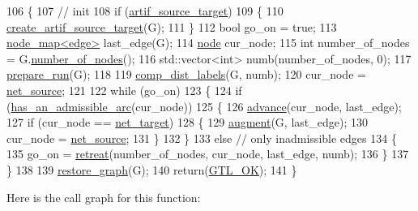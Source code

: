 \begin{DoxyCode}
106 \{
107     \textcolor{comment}{// init}
108     \textcolor{keywordflow}{if} (\mbox{\hyperlink{classmaxflow__sap_a5d19d178a861e252c84fc392e19bf0ae}{artif\_source\_target}})
109     \{
110         \mbox{\hyperlink{classmaxflow__sap_a617016b94a4924fb2574ab87c970d49c}{create\_artif\_source\_target}}(G);
111     \}
112     \textcolor{keywordtype}{bool} go\_on = \textcolor{keyword}{true};
113     \mbox{\hyperlink{classnode__map}{node\_map<edge>}} last\_edge(G);
114     \mbox{\hyperlink{classnode}{node}} cur\_node;
115     \textcolor{keywordtype}{int} number\_of\_nodes = G.\mbox{\hyperlink{classgraph_a42c78e0a9f115655e3ff0efe35ebfc4e}{number\_of\_nodes}}();
116     std::vector<int> numb(number\_of\_nodes, 0);
117     \mbox{\hyperlink{classmaxflow__sap_a4504b071456d536371ff6d07055e800d}{prepare\_run}}(G);
118 
119     \mbox{\hyperlink{classmaxflow__sap_ab9a8d9e4e32a8eb6390c0d2fb3cb9596}{comp\_dist\_labels}}(G, numb);
120     cur\_node = \mbox{\hyperlink{classmaxflow__sap_abd4266c76dbd73f7f719d3a4fba2655d}{net\_source}};
121 
122     \textcolor{keywordflow}{while} (go\_on)
123     \{
124         \textcolor{keywordflow}{if} (\mbox{\hyperlink{classmaxflow__sap_a4fdfe2e37832ed2e522b5c972aa1ba5f}{has\_an\_admissible\_arc}}(cur\_node))
125         \{
126             \mbox{\hyperlink{classmaxflow__sap_a0eb02b00fa0840cfad87eb6d67c9b849}{advance}}(cur\_node, last\_edge);
127             \textcolor{keywordflow}{if} (cur\_node == \mbox{\hyperlink{classmaxflow__sap_a8d0e8f448ed29a1329a70c8f4f496c2c}{net\_target}})
128             \{
129                 \mbox{\hyperlink{classmaxflow__sap_a02f7814313a36b30bb99c40ead6c9ef5}{augment}}(G, last\_edge);
130                 cur\_node = \mbox{\hyperlink{classmaxflow__sap_abd4266c76dbd73f7f719d3a4fba2655d}{net\_source}};
131             \}
132         \}
133         \textcolor{keywordflow}{else}    \textcolor{comment}{// only inadmissible edges}
134         \{
135             go\_on = \mbox{\hyperlink{classmaxflow__sap_a88a24204f44031d2332493474ee18f95}{retreat}}(number\_of\_nodes, cur\_node, last\_edge, numb);
136         \}
137     \}
138 
139     \mbox{\hyperlink{classmaxflow__sap_ad1a311df47e4b9936ead7c306d723ed0}{restore\_graph}}(G);
140     \textcolor{keywordflow}{return}(\mbox{\hyperlink{classalgorithm_af1a0078e153aa99c24f9bdf0d97f6710a5114c20e4a96a76b5de9f28bf15e282b}{GTL\_OK}});
141 \}
\end{DoxyCode}
Here is the call graph for this function\+:\nopagebreak
